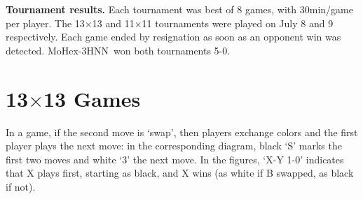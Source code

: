 \documentclass{IOS-Book-Article}
\def\Mt{\mbox{\sc MoHex-3HNN}}
\begin{document}
{\bf Tournament results.}
Each tournament was best of 8 games,
with 30min/game per player.
The 13$\times$13 and 11$\times$11 tournaments were played
on July 8 and 9 respectively.
Each game ended by resignation as soon as an opponent win was detected.
\Mt\ won both tournaments 5-0.

\section{13$\times$13 Games}
In a game, if the second move is `swap', then players
exchange colors and the first player plays the next move:
in the corresponding diagram, black `S' marks the first two moves
and white `3' the next move.
In the figures, `X-Y 1-0' indicates that X plays first, starting as black, 
and X wins (as white if B swapped, as black if not).
\end{document}
